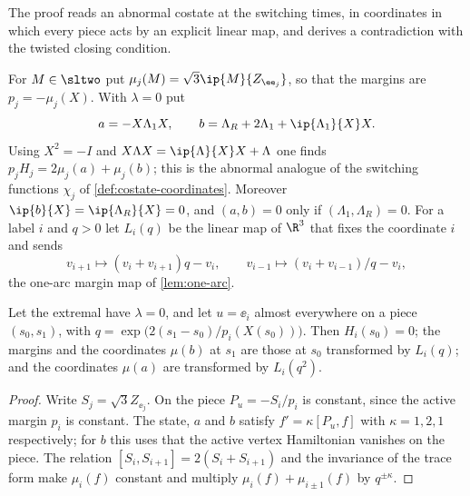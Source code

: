The proof reads an abnormal costate at the switching times, in coordinates in which every piece
acts by an explicit linear map, and derives a contradiction with the twisted closing condition.

 For $M\in\sltwo$ put $\mu_j(M)=\sqrt3\ip{M}{Z_{\ee_j}}$, so that the margins
are $p_j=-\mu_j(X)$. With $\lambda=0$ put
\[
a=-X\Lambda_1X,\qquad b=\Lambda_R+2\Lambda_1+\ip{\Lambda_1}{X}X.
\]
Using $X^2=-I$ and $X\Lambda X=\ip{\Lambda}{X}X+\Lambda$ one finds
$p_jH_j=2\mu_j(a)+\mu_j(b)$; this is the abnormal
analogue of the switching functions $\chi_j$ of \cref{def:costate-coordinates}. Moreover
$\ip{b}{X}=\ip{\Lambda_R}{X}=0$, and $(a,b)=0$ only if $(\Lambda_1,\Lambda_R)=0$. For a label $i$
and $q>0$ let $L_i(q)$ be the linear map of $\R^3$ that fixes the coordinate $i$ and sends
\[
v_{i+1}\mapsto(v_i+v_{i+1})q-v_i,\qquad v_{i-1}\mapsto(v_i+v_{i-1})/q-v_i,
\]
the one-arc margin map of \cref{lem:one-arc}.

\begin{lemma}\label{red:abnormal-transport}
Let the extremal have $\lambda=0$, and let $u=\ee_i$ almost everywhere on a piece $(s_0,s_1)$, with
$q=\exp\bigl(2(s_1-s_0)/p_i(X(s_0))\bigr)$. Then $H_i(s_0)=0$; the margins and the coordinates
$\mu(b)$ at $s_1$ are those at $s_0$ transformed by $L_i(q)$; and the coordinates $\mu(a)$ are
transformed by $L_i(q^2)$.
\end{lemma}

\begin{proof}
Write $S_j=\sqrt3Z_{\ee_j}$. On the piece $P_u=-S_i/p_i$ is constant, since the active margin
$p_i$ is constant. The state, $a$ and $b$ satisfy $f'=\kappa[P_u,f]$ with $\kappa=1,2,1$
respectively; for $b$ this uses that the active vertex Hamiltonian vanishes on the piece. The
relation $[S_i,S_{i+1}]=2(S_i+S_{i+1})$ and the invariance of the trace form make $\mu_i(f)$
constant and multiply $\mu_i(f)+\mu_{i\pm1}(f)$ by $q^{\pm\kappa}$.
\end{proof}

